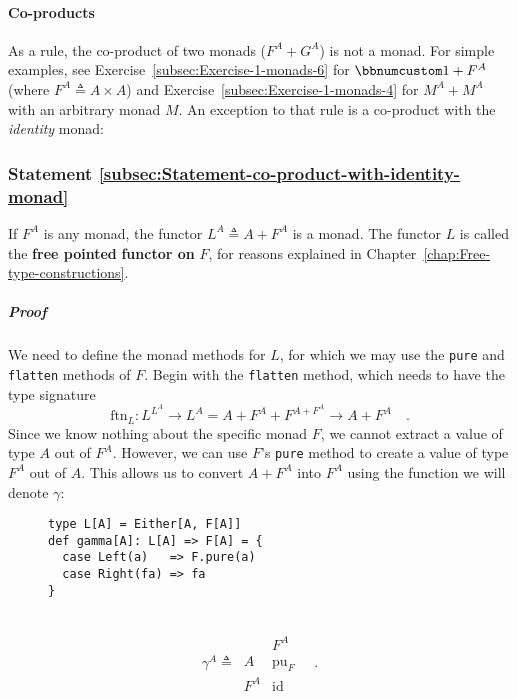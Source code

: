 \paragraph{Co-products}

As a rule, the co-product of two monads ($F^{A}+G^{A}$) is not a
monad. For simple examples, see Exercise~\ref{subsec:Exercise-1-monads-6}
for $\bbnum 1+F^{A}$ (where $F^{A}\triangleq A\times A$) and Exercise~\ref{subsec:Exercise-1-monads-4}
for $M^{A}+M^{A}$ with an arbitrary monad $M$. An exception to that
rule is a co-product with the \emph{identity} monad:

\subsubsection{Statement \label{subsec:Statement-co-product-with-identity-monad}\ref{subsec:Statement-co-product-with-identity-monad}}

If $F^{A}$ is any monad, the functor $L^{A}\triangleq A+F^{A}$ is
a monad. The functor $L$ is called the \textbf{free pointed}
\textbf{functor on} $F$, for reasons explained in Chapter~\ref{chap:Free-type-constructions}.

\subparagraph{Proof}

We need to define the monad methods for $L$, for which we may use
the \lstinline!pure! and \lstinline!flatten! methods of $F$. Begin
with the \lstinline!flatten! method, which needs to have the type
signature
\[
\text{ftn}_{L}:L^{L^{A}}\rightarrow L^{A}=A+F^{A}+F^{A+F^{A}}\rightarrow A+F^{A}\quad.
\]
Since we know nothing about the specific monad $F$, we cannot extract
a value of type $A$ out of $F^{A}$. However, we can use $F$\textsf{'}s \lstinline!pure!
method to create a value of type $F^{A}$ out of $A$. This allows
us to convert $A+F^{A}$ into $F^{A}$ using the function we will
denote $\gamma$:

\begin{wrapfigure}{l}{0.55\columnwidth}%
\vspace{-0.8\baselineskip}
\begin{lstlisting}
type L[A] = Either[A, F[A]]
def gamma[A]: L[A] => F[A] = {
  case Left(a)   => F.pure(a)
  case Right(fa) => fa
}
\end{lstlisting}

\vspace{-2\baselineskip}
\end{wrapfigure}%

~\vspace{-0.2\baselineskip}
\[
\gamma^{A}\triangleq\,\begin{array}{|c||c|}
 & F^{A}\\
\hline A & \text{pu}_{F}\\
F^{A} & \text{id}
\end{array}\quad.
\]

